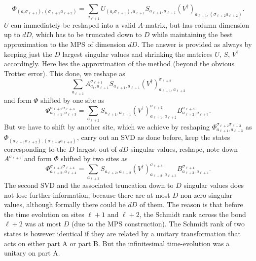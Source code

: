 \documentclass[a4paper,10pt,oneside,onecolumn,1p,times]{elsarticle}
\begin{document}
\begin{equation}
\Phi_{(a_\ell \sigma_{\ell+1}),(\sigma_{\ell+2} a_{\ell+2})} = \sum_{a_{\ell+1}} U_{(a_\ell \sigma_{\ell+1}),a_{\ell+1}} S_{a_{\ell+1},a_{\ell+1}} (V^\dagger)_{a_{\ell+1}, (\sigma_{\ell+2} a_{\ell+2})}.
\end{equation}
$U$ can immediately be reshaped into a valid $A$-matrix, but has column dimension up to $dD$, which has to be truncated down to $D$ while maintaining the best approximation to the MPS of dimension $dD$. The answer is provided as always by keeping just the $D$ largest singular values and shrinking the matrices $U$, $S$, $V^\dagger$ accordingly. Here lies the approximation of the method (beyond the obvious Trotter error). This done, we reshape as
\begin{equation}
\sum_{a_{\ell+1}} A^{\sigma_{\ell+1}}_{a_\ell, a_{\ell+1}}  S_{a_{\ell+1},a_{\ell+1}} (V^\dagger)^{\sigma_{\ell+2}}_{a_{\ell+1},  a_{\ell+2}}
\end{equation}
and form $\Phi$ shifted by one site as
\begin{equation}
\Phi^{\sigma_{\ell+2}\sigma_{\ell+3}}_{a_{\ell+1},a_{\ell+3}} = \sum_{a_{\ell+2}} S_{a_{\ell+1},a_{\ell+1}} (V^\dagger)^{\sigma_{\ell+2}}_{a_{\ell+1},  a_{\ell+2}} B^{\sigma_{\ell+3}}_{a_{\ell+2},  a_{\ell+3}} .
\end{equation}
But we have to shift by another site, which we achieve by reshaping $\Phi^{\sigma_{\ell+2}\sigma_{\ell+3}}_{a_{\ell+1},a_{\ell+3}}$ as $\Phi_{(a_{\ell+1}\sigma_{\ell+2}),(\sigma_{\ell+3} a_{\ell+3})}$, carry out an SVD as done before, keep the states corresponding to the $D$ largest out of $dD$ singular values, reshape, note down $A^{\sigma_{\ell+2}}$ and form $\Phi$ shifted by two sites as
\begin{equation}
\Phi^{\sigma_{\ell+3}\sigma_{\ell+4}}_{a_{\ell+2},a_{\ell+4}} = \sum_{a_{\ell+3}} S_{a_{\ell+2},a_{\ell+2}} (V^\dagger)^{\sigma_{\ell+3}}_{a_{\ell+2},  a_{\ell+3}} B^{\sigma_{\ell+4}}_{a_{\ell+3},  a_{\ell+4}} .
\end{equation}
The second SVD and the associated truncation down to $D$ singular values does not lose further information, because there are at most $D$ non-zero singular values, although formally there could be $dD$ of them. The reason is that before the time evolution on sites $\ell+1$ and $\ell+2$, the Schmidt rank across the bond $\ell+2$ was at most $D$ (due to the MPS construction). The Schmidt rank of two states is however identical if they are related by a unitary transformation that acts on either part A or part B. But the infinitesimal time-evolution was a unitary on part A.
\end{document}
